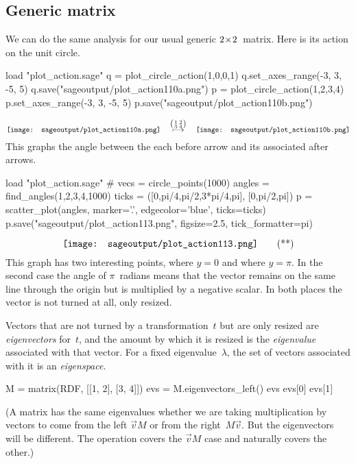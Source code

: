 \subsection{Generic matrix}
We can do the same analysis for our usual generic $2 \! \times \! 2$~matrix.
Here is its action on the unit circle.
\begin{sageoutput}[d,0,4;d,5,7]
load "plot_action.sage"
q = plot_circle_action(1,0,0,1) 
q.set_axes_range(-3, 3, -5, 5) 
q.save("sageoutput/plot_action110a.png")
p = plot_circle_action(1,2,3,4) 
p.set_axes_range(-3, 3, -5, 5) 
p.save("sageoutput/plot_action110b.png")
\end{sageoutput}
\begin{equation*}
  \vcenteredhbox{\texttt{[image: sageoutput/plot\_action110a.png]}}
  \quad\mapsunder{\big (\begin{smallmatrix} 1 &2 \\ 3 &4 \end{smallmatrix}\big )}\quad
  \vcenteredhbox{\texttt{[image: sageoutput/plot\_action110b.png]}}
\end{equation*}
This graphs the angle between the each before arrow and its associated after
arrows.
\begin{sageoutput}[d,0,1]
load "plot_action.sage"  
# vecs = circle_points(1000)
angles = find_angles(1,2,3,4,1000)
ticks = ([0,pi/4,pi/2,3*pi/4,pi], [0,pi/2,pi])
p = scatter_plot(angles, marker='.', edgecolor='blue', ticks=ticks)
p.save("sageoutput/plot_action113.png", figsize=2.5, tick_formatter=pi)
\end{sageoutput}
\begin{equation*}
  \vcenteredhbox{\texttt{[image: sageoutput/plot\_action113.png]}}
  \tag{**}
\end{equation*}
This graph has two interesting points, where $y=0$ and where 
$y=\pi$.
In the second case
the angle of $\pi$~radians means that the vector remains on the
same line through the origin but is multiplied by a negative scalar.
In both places the vector is not turned at all, only resized.

Vectors that are not turned by a transformation~$t$ but are only resized 
are \textit{eigenvectors} for~$t$, and the amount by which it is 
resized is the \textit{eigenvalue} associated with that vector.
For a fixed eigenvalue~$\lambda$, the set of vectors associated with
it is an \textit{eigenspace}.
\begin{sageoutput}[s,3,59,13]
M = matrix(RDF, [[1, 2], [3, 4]])
evs = M.eigenvectors_left()
evs
evs[0] 
evs[1]
\end{sageoutput}
\noindent
(A matrix has the same eigenvalues whether we are taking multiplication 
by vectors to come from the left $\vec{v}M$ or from the 
right~$M\vec{v}$.  
But the eigenvectors will be different. 
The \Sage{} operation  covers the 
$\vec{v}M$ case and naturally 
covers the other.)

